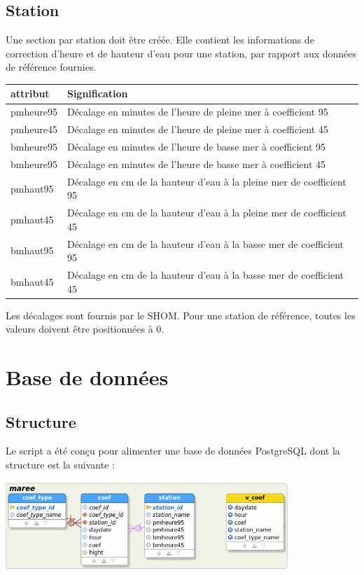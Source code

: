 \documentclass[12pt,a4paper]{article}
\begin{document}
\subsection{Station}

Une section par station doit être créée. Elle contient les informations de correction d'heure et de hauteur d'eau pour une station, par rapport aux données de référence fournies.

\begin{tabular}{|l|>{\raggedright\arraybackslash}p{12cm}|}
\hline 
attribut & Signification \\ 
\hline 
pmheure95 & Décalage en minutes de l'heure de pleine mer à coefficient 95 \\
pmheure45 & Décalage en minutes de l'heure de pleine mer à coefficient 45 \\
bmheure95 & Décalage en minutes de l'heure de basse mer à coefficient 95 \\
bmheure95 & Décalage en minutes de l'heure de basse mer à coefficient 45 \\
pmhaut95 & Décalage en cm de la hauteur d'eau à la pleine mer de coefficient 95\\
pmhaut45 & Décalage en cm de la hauteur d'eau à la pleine mer de coefficient 45\\
bmhaut95 & Décalage en cm de la hauteur d'eau à la basse mer de coefficient 95\\
bmhaut45 & Décalage en cm de la hauteur d'eau à la basse mer de coefficient 45\\
\hline 
\end{tabular} 

Les décalages sont fournis par le SHOM. 
Pour une station de référence, toutes les valeurs doivent être positionnées à 0.

\section{Base de données}
\subsection{Structure}
Le script a été conçu pour alimenter une base de données PostgreSQL dont la structure est la suivante : 

\includegraphics[width=0.8\textwidth]{../database/referentiel-maree}
\end{document}
